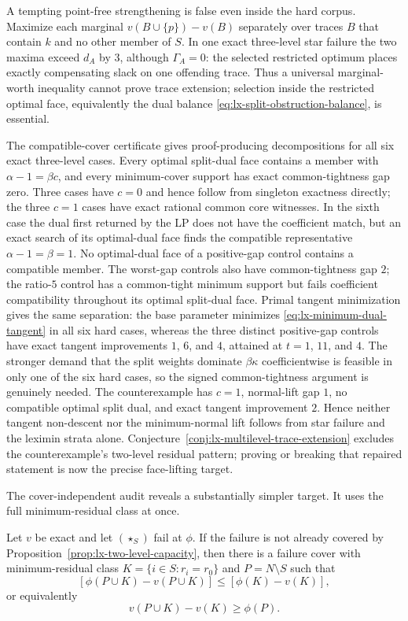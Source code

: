 A tempting point-free strengthening is false even inside the hard corpus.
Maximize each marginal $v(B\cup\{p\})-v(B)$ separately over traces $B$ that
contain $k$ and no other member of $S$.  In one exact three-level star failure
the two maxima exceed $d_A$ by $3$, although $\Gamma_A=0$: the selected
restricted optimum places exactly compensating slack on one offending trace.
Thus a universal marginal-worth inequality cannot prove trace extension;
selection inside the restricted optimal face, equivalently the dual balance
\eqref{eq:lx-split-obstruction-balance}, is essential.

The compatible-cover certificate gives proof-producing decompositions for all
six exact three-level cases.  Every optimal split-dual face contains a member
with $\alpha-1=\beta c$, and every minimum-cover support has exact
common-tightness gap zero.  Three cases have $c=0$ and hence follow from
singleton exactness directly; the three $c=1$ cases have exact rational common
core witnesses.  In the sixth case the dual first returned by the LP does not
have the coefficient match, but an exact search of its optimal-dual face finds
the compatible representative $\alpha-1=\beta=1$.  No optimal-dual face of a
positive-gap control contains a compatible member.  The worst-gap controls
also have common-tightness gap $2$; the ratio-$5$ control has a common-tight
minimum support but fails coefficient compatibility throughout its optimal
split-dual face.  Primal tangent minimization gives the same separation: the
base parameter minimizes \eqref{eq:lx-minimum-dual-tangent} in all six hard
cases, whereas the three distinct positive-gap controls have exact tangent
improvements $1$, $6$, and $4$, attained at $t=1$, $11$, and $4$.
The stronger demand that the split weights dominate
$\beta\kappa$ coefficientwise is feasible in only one of the six
hard cases, so the signed common-tightness argument is genuinely needed.  The
counterexample has $c=1$, normal-lift gap $1$, no compatible optimal split
dual, and exact tangent improvement $2$.  Hence neither tangent non-descent
nor the minimum-normal lift follows from star failure and the leximin strata
alone.  Conjecture~\ref{conj:lx-multilevel-trace-extension} excludes the
counterexample's two-level residual pattern; proving or breaking that repaired
statement is now the precise face-lifting target.

The cover-independent audit reveals a substantially simpler target.  It uses
the full minimum-residual class at once.

\begin{conjecture}
\label{conj:lx-class-carrier}
Let $v$ be exact and let $(\star_S)$ fail at $\phi$.  If the failure is not
already covered by Proposition~\ref{prop:lx-two-level-capacity}, then there is
a failure cover with minimum-residual class
$K=\{i\in S:r_i=r_0\}$ and $P=N\setminus S$ such that
\[
 [\phi(P\cup K)-v(P\cup K)]
 \leq[\phi(K)-v(K)],
 \tag{KC}\label{eq:lx-class-carrier}
\]
or equivalently
\[
 v(P\cup K)-v(K)\geq\phi(P).
\]
\end{conjecture}


